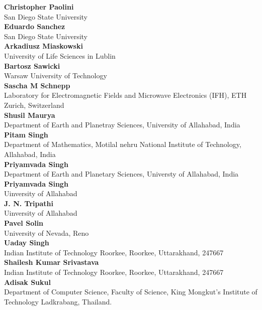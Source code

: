 \documentclass[article,A4,11pt]{llncs}%
\begin{document}
    {\bf Christopher Paolini}\\
    San Diego State University\\
        \noindent
    {\bf Eduardo Sanchez}\\
    San Diego State University\\
        \noindent
    {\bf Arkadiusz Miaskowski}\\
    University of Life Sciences in Lublin\\
        \noindent
    {\bf Bartosz Sawicki}\\
    Warsaw University of Technology\\
        \noindent
    {\bf Sascha M Schnepp}\\
    Laboratory for Electromagnetic Fields and Microwave Electronics (IFH), ETH Zurich, Switzerland\\
        \noindent
    {\bf Shusil Maurya}\\
    Department of Earth and Planetray Sciences, University of Allahabad, India\\
        \noindent
    {\bf Pitam Singh}\\
    Department of Mathematics, Motilal nehru National Institute of Technology, Allahabad, India\\
        \noindent
    {\bf Priyamvada Singh}\\
    Department of  Earth and Planetary Sciences, Universty of Allahabad,  India\\
        \noindent
    {\bf Priyamvada Singh}\\
    Uinversity of Allahabad\\
        \noindent
    {\bf J. N. Tripathi}\\
    Uinversity of Allahabad\\
        \noindent
    {\bf Pavel Solin}\\
    University of Nevada, Reno\\
        \noindent
    {\bf Uaday Singh}\\
    Indian Institute of Technology Roorkee, Roorkee, Uttarakhand, 247667\\
        \noindent
    {\bf Shailesh Kumar Srivastava}\\
    Indian Institute of Technology Roorkee, Roorkee, Uttarakhand, 247667\\
        \noindent
    {\bf Adisak Sukul}\\
    Department of Computer Science, Faculty of Science, King Mongkut's Institute of Technology Ladkrabang, Thailand.\\
\end{document}
